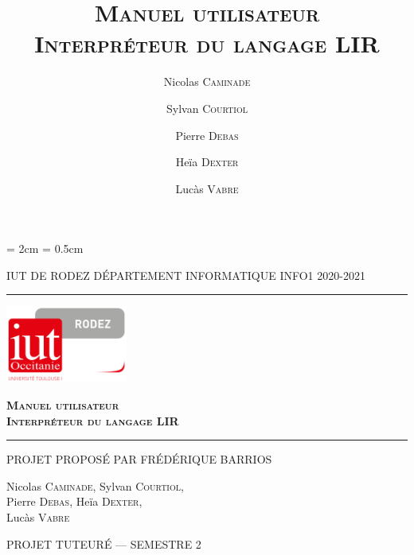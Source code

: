 \documentclass[11pt,a4paper,titlepage,openany]{book}
\title{\textsc{\textbf{Manuel utilisateur\\Interpréteur du langage LIR}}}
\date{}
\author{Nicolas \textsc{Caminade} \and
        Sylvan \textsc{Courtiol} \and
        Pierre \textsc{Debas} \and
        Heïa \textsc{Dexter} \and
        Lucàs \textsc{Vabre} }
\begin{document}
    \renewcommand\sfdefault{pag}

    \lhead{\leftmark}

    \cfoot{\thepage}
    \headheight = 2cm
    \headsep = 0.5cm

    \begin{titlepage}
        \selectfont

        \begin{center}\normalsize
            \MakeUppercase{IUT de Rodez \hfill Département informatique
                \hfill INFO1 2020-2021}
        \end{center}
        \vspace*{0.1cm}
        \hrule
        \vspace*{0.2cm}
        \begin{flushright}
            \includegraphics[width=4cm]{img/logoiut}
        \end{flushright}
        \vspace*{2cm}
        \begin{flushright}\Huge
            \textsc{\textbf{Manuel utilisateur\\Interpréteur du langage LIR}}
        \end{flushright}
        \hrule
        \begin{flushleft}
            \MakeUppercase{Projet proposé par Frédérique Barrios}
        \end{flushleft}
        \vspace*{2cm}
        \begin{center}\Large
            Nicolas \textsc{Caminade}, Sylvan \textsc{Courtiol},\\
            Pierre \textsc{Debas}, Heïa \textsc{Dexter}, \\
            Lucàs \textsc{Vabre}
        \end{center}
        \vfill
        \begin{center}\normalsize
            \MakeUppercase{Projet tuteuré --- Semestre 2}
        \end{center}
    \end{titlepage}
\end{document}
